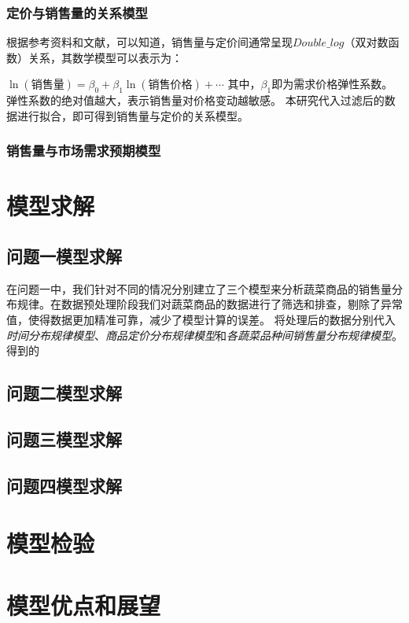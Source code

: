 \documentclass{article}
\begin{document}
\subsubsection{定价与销售量的关系模型}
根据参考资料和文献，可以知道，销售量与定价间通常呈现$Double\_log$（双对数函数）关系，其数学模型可以表示为：

$\ln(\text{销售量}) = \beta_0 + \beta_1 \ln(\text{销售价格}) + \cdots$
其中，$\beta_1$即为需求价格弹性系数。弹性系数的绝对值越大，表示销售量对价格变动越敏感。
本研究代入过滤后的数据进行拟合，即可得到销售量与定价的关系模型。

\subsubsection{销售量与市场需求预期模型}

\section{模型求解}


\subsection{问题一模型求解}
在问题一中，我们针对不同的情况分别建立了三个模型来分析蔬菜商品的销售量分布规律。在数据预处理阶段我们对蔬菜商品的数据进行了筛选和排查，剔除了异常值，使得数据更加精准可靠，减少了模型计算的误差。
将处理后的数据分别代入\textit{时间分布规律模型}、\textit{商品定价分布规律模型}和\textit{各蔬菜品种间销售量分布规律模型}。
得到的%
\subsection{问题二模型求解}

\subsection{问题三模型求解}

\subsection{问题四模型求解}


\section{模型检验}

\section{模型优点和展望}
\end{document}
